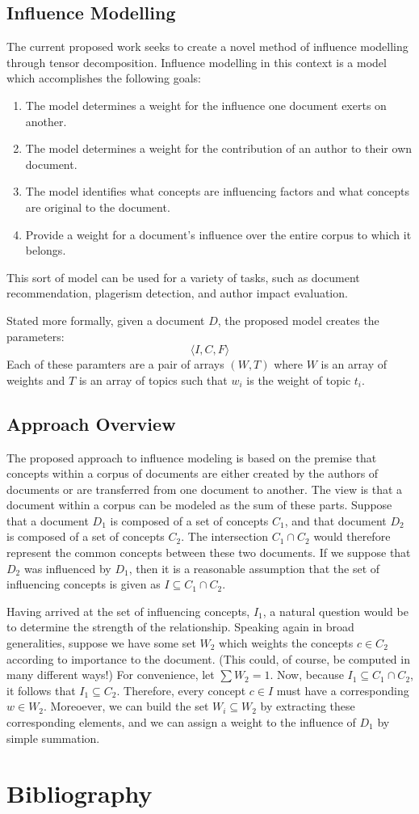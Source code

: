 \documentclass{article}
\begin{document}
\subsection{Influence Modelling}
The current proposed work seeks to create a novel method of influence
modelling through tensor decomposition. Influence modelling in this
context is a model which accomplishes the following goals:
\begin{enumerate}
\item The model determines a weight for the influence one document
  exerts on another.
\item The model determines a weight for the contribution of an author
  to their own document. 
\item The model identifies what concepts are influencing factors and
  what concepts are original to the document.
\item Provide a weight for a document's influence over the entire
  corpus to which it belongs.
\end{enumerate}
This sort of model can be used for a variety of tasks, such as
document recommendation, plagerism detection, and author impact
evaluation.  

Stated more formally, given a document $D$, the proposed model creates
the parameters:
\[
\langle I, C, F \rangle 
\]
Each of these paramters are a pair of arrays $(W, T)$ where $W$ is an
array of weights and $T$ is an array of topics such that $w_i$ is the
weight of topic $t_i$.

\subsection{Approach Overview}
The proposed approach to influence modeling is based on the premise
that concepts within a corpus of documents are either created by the
authors of documents or are transferred from one document to another.
The view is that a document within a corpus can be modeled as the sum
of these parts.  Suppose that a document $D_1$ is composed of a set of
concepts $C_1$, and that document $D_2$ is composed of a set of
concepts $C_2$.  The intersection $C_1 \cap C_2$ would therefore
represent the common concepts between these two documents.  If we
suppose that $D_2$ was influenced by $D_1$, then it is a reasonable
assumption that the set of influencing concepts is given as $I \subseteq
C_1 \cap C_2$.  

Having arrived at the set of influencing concepts, $I_1$, a natural
question would be to determine the strength of the relationship.
Speaking again in broad generalities, suppose we have some set $W_2$
which weights the concepts $c \in C_2$ according to importance to the
document.  (This could, of course, be computed in many different
ways!) For convenience, let $\sum W_2 = 1$.  Now, because $I_1 \subseteq
C_1 \cap C_2$, it follows that $I_1 \subseteq C_2$.  Therefore, every
concept $c\in I$ must have a corresponding $w \in W_2$.  Moreoever, we
can build the set $W_i \subseteq W_2$ by extracting these
corresponding elements, and we can assign a weight to the influence of
$D_1$ by simple summation.

\section{Bibliography}
{}

\end{document}
